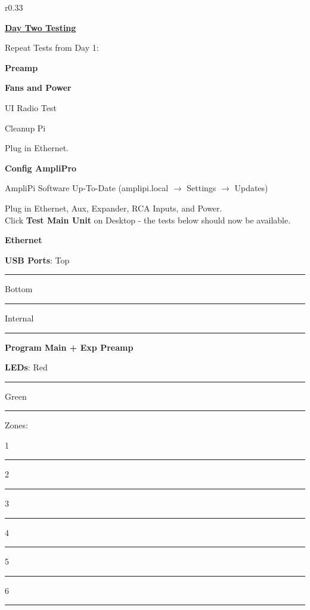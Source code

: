 \documentclass{article}
\begin{document}
\begin{wrapfigure}{r}{0.33\textwidth}
  \begin{framed}
    \begin{center}\textbf{\underline{Day Two Testing}}\end{center}
    \vspace{2ex}
    \begin{checklist}
    \item Repeat Tests from Day 1:
    \begin{checklist}
      \item \textbf{Preamp}
      \item \textbf{Fans and Power}
    \end{checklist}
    \item UI Radio Test
    \item Cleanup Pi
    \end{checklist}
  \end{framed}
\end{wrapfigure}

\bigskip
Plug in Ethernet.

\begin{checklist}
  \item \textbf{Config AmpliPro}
  \item AmpliPi Software Up-To-Date (amplipi.local $\rightarrow$ Settings $\rightarrow$ Updates)
\end{checklist}

Plug in Ethernet, Aux, Expander, RCA Inputs, and Power. \\
Click \textbf{Test Main Unit} on Desktop - the tests below should now be available.

\begin{checklist}
  \item \textbf{Ethernet}
\end{checklist}

\begin{checklist}
  \item \textbf{USB Ports}: Top \rule{2em}{0.4pt} Bottom \rule{2em}{0.4pt} Internal \rule{2em}{0.4pt}
  \item \textbf{Program Main + Exp Preamp}
  \item \textbf{LEDs}: Red \rule{2em}{0.4pt} Green \rule{2em}{0.4pt} Zones:
  \item[] \hspace{3em} 1 \rule{2em}{0.4pt} 2 \rule{2em}{0.4pt} 3 \rule{2em}{0.4pt}
          4 \rule{2em}{0.4pt} 5 \rule{2em}{0.4pt} 6 \rule{2em}{0.4pt}
\end{checklist}
\end{document}
